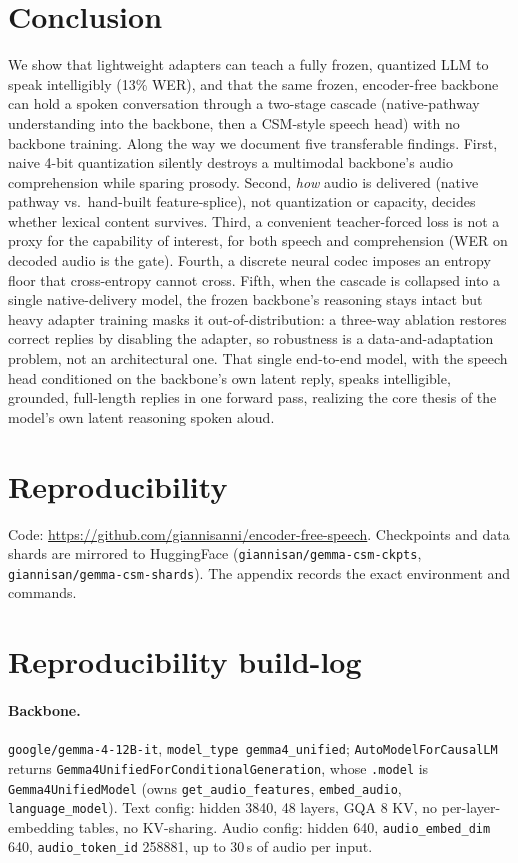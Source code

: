 \documentclass[11pt]{article}
\begin{document}
\section{Conclusion}
\label{sec:conclusion}
We show that lightweight adapters can teach a fully frozen, quantized LLM to speak
intelligibly (13\% WER), and that the same frozen, encoder-free backbone can hold a
spoken conversation through a two-stage cascade (native-pathway understanding into
the backbone, then a CSM-style speech head) with no backbone training. Along the way
we document five transferable findings. First, naive 4-bit quantization silently
destroys a multimodal backbone's audio comprehension while sparing prosody. Second,
\emph{how} audio is delivered (native pathway vs.\ hand-built feature-splice), not
quantization or capacity, decides whether lexical content survives. Third, a
convenient teacher-forced loss is not a proxy for the capability of interest, for
both speech and comprehension (WER on decoded audio is the gate). Fourth, a discrete
neural codec imposes an entropy floor that cross-entropy cannot cross. Fifth, when
the cascade is collapsed into a single native-delivery model, the frozen backbone's
reasoning stays intact but heavy adapter training masks it out-of-distribution: a
three-way ablation restores correct replies by disabling the adapter, so robustness
is a data-and-adaptation problem, not an architectural one. That single end-to-end
model, with the speech head conditioned on the backbone's own latent reply, speaks
intelligible, grounded, full-length replies in one forward pass, realizing the core
thesis of the model's own latent reasoning spoken aloud.

\section*{Reproducibility}
Code: \url{https://github.com/giannisanni/encoder-free-speech}. Checkpoints and data shards
are mirrored to HuggingFace (\texttt{giannisan/gemma-csm-ckpts},
\texttt{giannisan/gemma-csm-shards}). The appendix records the exact environment
and commands.




\appendix
\section{Reproducibility build-log}
\label{app:repro}
\paragraph{Backbone.} \texttt{google/gemma-4-12B-it}, \texttt{model\_type
gemma4\_unified}; \texttt{AutoModelForCausalLM} returns
\texttt{Gemma4UnifiedForConditionalGeneration}, whose \texttt{.model} is
\texttt{Gemma4UnifiedModel} (owns \texttt{get\_audio\_features}, \texttt{embed\_audio},
\texttt{language\_model}). Text config: hidden 3840, 48 layers, GQA 8 KV, no
per-layer-embedding tables, no KV-sharing. Audio config: hidden 640,
\texttt{audio\_embed\_dim} 640, \texttt{audio\_token\_id} 258881, up to 30\,s of
audio per input.
\end{document}

